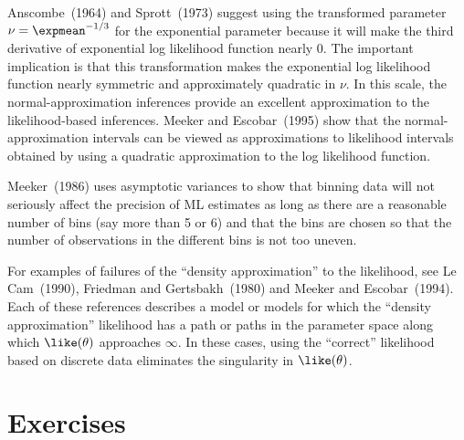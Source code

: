 Anscombe~(1964) and Sprott~(1973) suggest using the transformed
parameter $\nu=\expmean^{-1/3}$ for the exponential parameter
because it will make the third derivative of exponential log
likelihood function nearly 0. The important implication is that this
transformation makes the exponential log likelihood function nearly
symmetric and approximately quadratic in $\nu$. In this scale, the
normal-approximation inferences provide an excellent approximation to
the likelihood-based inferences.  Meeker and Escobar~(1995) show that
the normal-approximation intervals can be viewed as approximations to
likelihood intervals obtained by using a quadratic approximation to
the log likelihood function.

Meeker~(1986) uses asymptotic variances to show that binning data will
not seriously affect the precision of ML estimates as long as there
are a reasonable number of bins (say more than 5 or 6) and that the
bins are chosen so that the number of observations in the different
bins is not too uneven.

For examples of failures of the ``density approximation'' to the
likelihood, see Le Cam~(1990), Friedman and Gertsbakh~(1980) and
Meeker and Escobar~(1994). Each of these references describes a
model or models for which the ``density approximation'' likelihood
has a path or paths in the parameter space along which
$\like(\theta)$ approaches $\infty$. In these cases, using the
``correct'' likelihood based on discrete data eliminates the
singularity in $\like(\theta)$.

\section*{Exercises}

